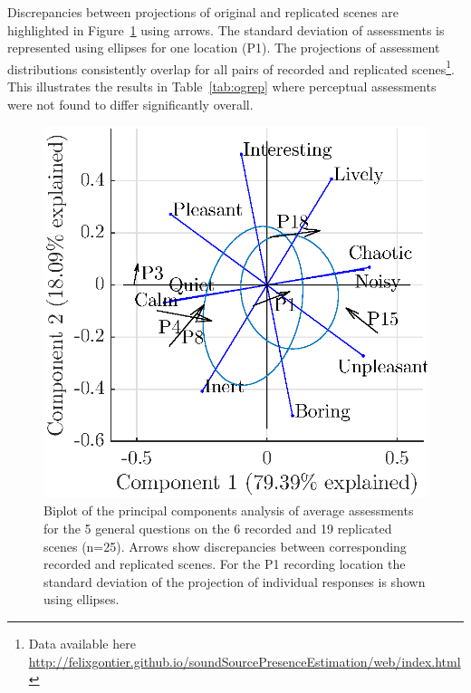 \documentclass[twocolumn]{article}
\begin{document}
Discrepancies between projections of original and replicated scenes are highlighted in Figure~\ref{fig:pspace_rec} using arrows. The standard deviation of assessments is represented using ellipses for one location (P1). The projections of assessment distributions consistently overlap for all pairs of recorded and replicated scenes\footnote{Data available here \url{http://felixgontier.github.io/soundSourcePresenceEstimation/web/index.html}}. This illustrates the results in Table~\ref{tab:ogrep} where perceptual assessments were not found to differ significantly overall.

\begin{figure}[th]
    \centering
    \includegraphics[width=0.8\columnwidth]{figures/pca_p1.eps}
    \caption{Biplot of the principal components analysis of average assessments for the 5 general questions on the 6 recorded and 19 replicated scenes (n=25). Arrows show discrepancies between corresponding recorded and replicated scenes. For the P1 recording location the standard deviation of the projection of individual responses is shown using ellipses.}\label{fig:pspace_rec}
\end{figure}
\end{document}
